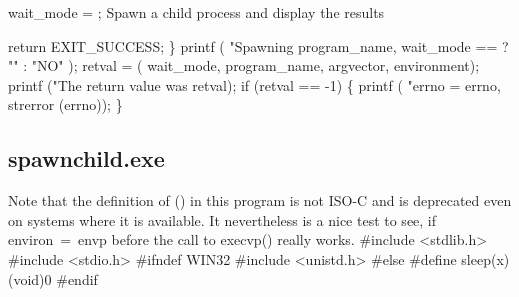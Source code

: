 \documentclass[11pt,a4paper]{article}%
\begin{document}
    wait_mode = ;
    \LA{}Spawn a child process and display the results~{\nwtagstyle{}}\RA{}
  
  return EXIT_SUCCESS;
\}
\eatline
{}\nwendcode{}\endmoddef\nwstartdeflinemarkup{}\nwenddeflinemarkup
printf (
  "Spawning %
  program_name,
  wait_mode ==  ? "" : "NO" );
retval =  (
  wait_mode,
  program_name,
  argvector,
  environment);
printf ("The return value was %
  retval);
if (retval == -1)
\{
  printf (
    "errno = %
    errno,
    strerror (errno));
\}
\nwendcode{}\nwdocspar
\subsection {{\Tt{}spawnchild.exe}}

Note that the definition of {\Tt{}()} in this program is not ISO-C
and is deprecated even on systems where it is available. It nevertheless
is a nice test to see, if {\Tt{}environ\ =\ envp} before the call to {\Tt{}execvp()}
really works.
\nwenddocs{}\endmoddef\nwstartdeflinemarkup\nwenddeflinemarkup
#include <stdlib.h> 
#include <stdio.h> 
#ifndef WIN32
  #include <unistd.h> 
#else
  #define sleep(x) (void)0
#endif
\end{document}
